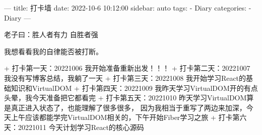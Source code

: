 ---
title: 打卡墙
date: 2022-10-6 10:12:00
sidebar: auto
tags:
 - Diary
categories:
 -  Diary
---

老子曰：胜人者有力 自胜者强

我想看看我的自律能否被打断。

+ 打卡第一天：20221006 我开始准备重新出发！！！
+ 打卡第二天：20221007 我没有写博客总结，我躺了一天
+ 打卡第三天：20221008 我开始学习React的基础知识和VirtualDOM
+ 打卡第四天：20221009 我昨天学习VirtualDOM开的有点头晕，我今天准备把它都看完
+ 打卡第五天：20221010 昨天学习VirtualDOM算是真正进入状态了，也能理解了很多很多，
  因为我相当于重写了两边来加深，今天上午应该都能学完VirtualDOM相关的，下午开始Fiber学习之旅
+ 打卡第六天：20221011 今天计划学习React的核心源码



